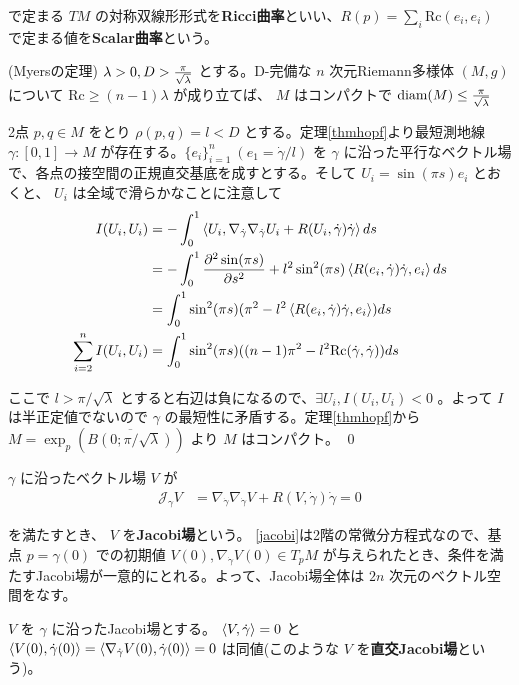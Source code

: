\documentclass[dvipdfmx,a4paper]{jsreport}
\theoremstyle{definition}
\newcommand{\der}{\partial}
\renewcommand{\bar}{\overline}
\begin{document}
で定まる $TM$ の対称双線形形式を\textbf{Ricci曲率}といい、$R(p)=\sum_i \mbox{Rc}(e_i,e_i)$ で定まる値を\textbf{Scalar曲率}という。

\thm\label{thmmyers} (Myersの定理) $\lambda>0,D>{\pi \over \sqrt{\lambda}}$ とする。D-完備な $n$ 次元Riemann多様体 $(M,g)$ について $\mbox{Rc} \geq (n-1)\lambda$ が成り立てば、 $M$ はコンパクトで $\mbox{diam}(M) \leq {\pi \over \sqrt{\lambda}}$ 

\prf 2点 $p,q \in M$ をとり $\rho(p,q)=l<D$ とする。定理\ref{thmhopf}より最短測地線 $\gamma:[0,1] \to M$ が存在する。$\{e_i\}_{i=1}^n \ (e_1=\dot{\gamma}/l)$ を $\gamma$ に沿った平行なベクトル場で、各点の接空間の正規直交基底を成すとする。そして $U_i=\sin(\pi s)e_i$ とおくと、 $U_i$ は全域で滑らかなことに注意して
\begin{align*}
    I(U_i,U_i) &=-\int_0^1 \ev{U_i,\nabla_{\dot{\gamma}}\nabla_{\dot{\gamma}}U_i+R(U_i,\dot{\gamma})\dot{\gamma}} ds \\
    &=-\int_0^1 {\der^2 \sin(\pi s) \over \der s^2}+l^2\sin^2(\pi s) \ev{R(e_i,\dot{\gamma})\dot{\gamma},e_i} ds \\
    &=\int_0^1 \sin^2(\pi s)(\pi^2-l^2 \ev{R(e_i,\dot{\gamma})\dot{\gamma},e_i}) ds \\
    \sum_{i=2}^n I(U_i,U_i) &=\int_0^1 \sin^2(\pi s)((n-1)\pi^2-l^2 \mbox{Rc}(\dot{\gamma},\dot{\gamma})) ds
\end{align*}

ここで $l>\pi/\sqrt{\lambda}$ とすると右辺は負になるので、$\exists U_i,I(U_i,U_i)<0$ 。よって $I$ は半正定値でないので $\gamma$ の最短性に矛盾する。定理\ref{thmhopf}から $M=\exp_p(\bar{B(0;\pi/\sqrt{\lambda})})$ より $M$ はコンパクト。 \qed

 $\gamma$ に沿ったベクトル場 $V$ が 
\begin{align}\label{jacobi}
    \mathcal{J}_\gamma V &=\nabla_{\dot{\gamma}}\nabla_{\dot{\gamma}}V+R(V,{\dot{\gamma}}){\dot{\gamma}}=0
\end{align}

を満たすとき、 $V$ を\textbf{Jacobi場}という。
\ref{jacobi}は2階の常微分方程式なので、基点 $p=\gamma(0)$ での初期値 $V(0),\nabla_{\dot{\gamma}}V(0) \in T_pM$ が与えられたとき、条件を満たすJacobi場が一意的にとれる。よって、Jacobi場全体は $2n$ 次元のベクトル空間をなす。

\lem\label{lemnormal} $V$ を $\gamma$ に沿ったJacobi場とする。
$\ev{V,\dot{\gamma}}=0$ と $\ev{V(0),\dot{\gamma}(0)}=\ev{\nabla_{\dot{\gamma}}V(0),\dot{\gamma}(0)}=0$ は同値(このような $V$ を\textbf{直交Jacobi場}という)。
\end{document}
